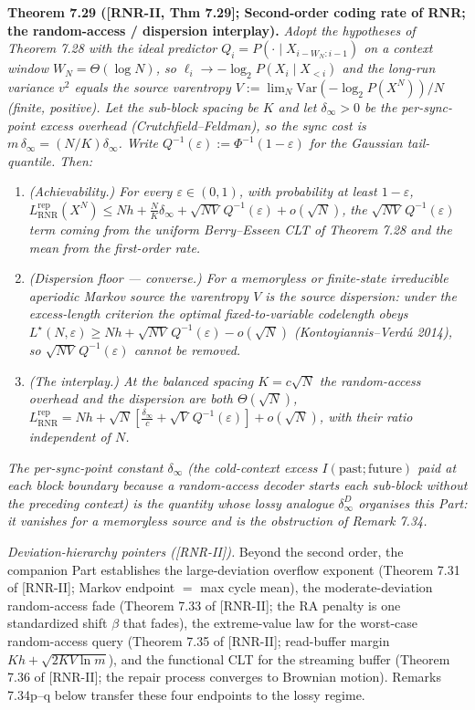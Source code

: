\documentclass[
]{article}
\begin{document}
\textbf{Theorem 7.29 ([RNR-II, Thm 7.29]; Second-order coding rate of RNR;
the random-access / dispersion interplay).} \emph{Adopt the hypotheses of
Theorem 7.28 with the ideal predictor $Q_i=P(\cdot\mid X_{i-W_N:i-1})$ on a
context window $W_N=\Theta(\log N)$, so $\ell_i\to-\log_2 P(X_i\mid X_{<i})$
and the long-run variance $v^2$ equals the source \emph{varentropy}
$V:=\lim_N\mathrm{Var}(-\log_2 P(X^N))/N$ (finite, positive). Let the sub-block
spacing be $K$ and let $\delta_\infty>0$ be the per-sync-point excess overhead
(Crutchfield--Feldman), so the sync cost is $m\,\delta_\infty=(N/K)\delta_\infty$.
Write $Q^{-1}(\varepsilon):=\Phi^{-1}(1-\varepsilon)$ for the Gaussian
tail-quantile. Then:}
\begin{enumerate}
\item \emph{(Achievability.) For every $\varepsilon\in(0,1)$, with probability
at least $1-\varepsilon$,
$L^{\mathrm{rep}}_{\mathrm{RNR}}(X^N)\le
Nh+\tfrac NK\delta_\infty+\sqrt{NV}\,Q^{-1}(\varepsilon)+o(\sqrt N)$,}
\emph{the $\sqrt{NV}\,Q^{-1}(\varepsilon)$ term coming from the uniform
Berry--Esseen CLT of Theorem 7.28 and the mean from the first-order rate.}
\item \emph{(Dispersion floor --- converse.) For a memoryless or finite-state
irreducible aperiodic Markov source the varentropy $V$ is the source
dispersion: under the excess-length criterion the optimal fixed-to-variable
codelength obeys $L^\star(N,\varepsilon)\ge Nh+\sqrt{NV}\,Q^{-1}(\varepsilon)
-o(\sqrt N)$ (Kontoyiannis--Verd\'u 2014), so $\sqrt{NV}\,Q^{-1}(\varepsilon)$
cannot be removed.}
\item \emph{(The interplay.) At the balanced spacing $K=c\sqrt N$ the
random-access overhead and the dispersion are both $\Theta(\sqrt N)$,
$L^{\mathrm{rep}}_{\mathrm{RNR}}=Nh+\sqrt N[\tfrac{\delta_\infty}{c}
+\sqrt V\,Q^{-1}(\varepsilon)]+o(\sqrt N)$, with their ratio independent of
$N$.}
\end{enumerate}
\emph{The per-sync-point constant $\delta_\infty$ (the \emph{cold-context}
excess $I(\text{past};\text{future})$ paid at each block boundary because a
random-access decoder starts each sub-block without the preceding context) is
the quantity whose lossy analogue $\delta_\infty^D$ organises this Part: it
vanishes for a memoryless source and is the obstruction of Remark 7.34.}

\emph{Deviation-hierarchy pointers ([RNR-II]).} Beyond the second order, the
companion Part establishes the large-deviation overflow exponent (Theorem 7.31
of [RNR-II]; Markov endpoint $=$ max cycle mean), the moderate-deviation
random-access fade (Theorem 7.33 of [RNR-II]; the RA penalty is one
standardized shift $\beta$ that fades), the extreme-value law for the
worst-case random-access query (Theorem 7.35 of [RNR-II]; read-buffer margin
$Kh+\sqrt{2KV\ln m}$), and the functional CLT for the streaming buffer
(Theorem 7.36 of [RNR-II]; the repair process converges to Brownian motion).
Remarks 7.34p--q below transfer these four endpoints to the lossy regime.
\end{document}
